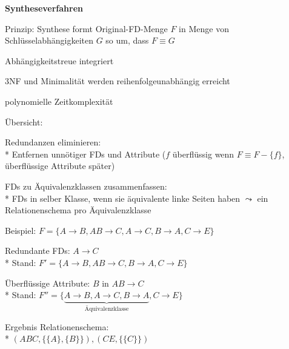 \textbf{Syntheseverfahren}
\begin{items}
	\item Prinzip: Synthese formt Original-FD-Menge \( F \) in Menge von Schlüsselabhängigkeiten \( G \) so um, dass \( F \equiv G \)
	\item Abhängigkeitstreue integriert
	\item 3NF und Minimalität werden reihenfolgeunabhängig erreicht
	\item polynomielle Zeitkomplexität
	\item Übersicht:
	\begin{enumeration}
		\item Redundanzen eliminieren: \\*
		Entfernen unnötiger FDs und Attribute (\( f \) überflüssig wenn \( F \equiv F - \{  f \} \), überflüssige Attribute später)
		\item FDs zu Äquivalenzklassen zusammenfassen: \\*
		FDs in selber Klasse, wenn sie äquivalente linke Seiten haben \( \leadsto \) ein Relationenschema pro Äquivalenzklasse
	\end{enumeration}
	\item Beispiel: \( F = \{ A \to B, AB \to C, A \to C, B \to A, C \to E \} \)
	\begin{enumeration}
		\item Redundante FDs: \( A \to C \) \\* Stand: \( F' = \{ A \to B, AB \to C, B \to A, C \to E \} \)
		\item Überflüssige Attribute: \( B \) in \( AB \to C \) \\* Stand: \( F'' = \{ \underbrace{A \to B, A \to C, B \to A}_{\text{Äquivalenzklasse}}, C \to E \} \)
		\item Ergebnis Relationenschema: \\* \( (ABC, \{ \{ A \}, \{ B \} \}), (CE, \{ \{ C \} \}) \)
	\end{enumeration}
\end{items}


